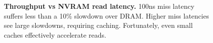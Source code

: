 \begin{figure}
  \centering
  \caption{\textbf{Throughput vs NVRAM read latency.} 100ns miss latency suffers less than a 10\% slowdown over DRAM.  Higher miss latencies see large slowdowns, requiring caching.  Fortunately, even small caches effectively accelerate reads.}
  \label{fig::ReadPerformance}
\end{figure}

